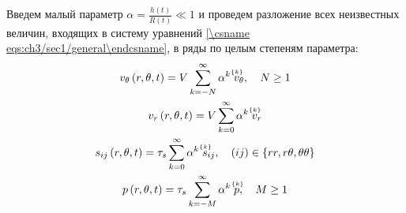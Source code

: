 Введем малый параметр $\alpha = \frac{h(t)}{R(t)} \ll 1$ и проведем разложение всех неизвестных величин, входящих в систему уравнений \cref{\csname eqs:ch3/sec1/general\endcsname}, в ряды по целым степеням параметра:
\begin{gather}
  \label{eqs:ch3/series/vt}
  v_{\theta}\left(r, \theta, t\right) = V \sum_{k=-N}^{\infty}{\alpha^{k} \; \uindex{v}{k}_{\theta}}, \quad N \ge 1
  \\
  \label{eqs:ch3/series/vr}
  v_{r}\left(r, \theta, t\right) = V \sum_{k=0}^{\infty}{\alpha^{k} \; \uindex{v}{k}_{r}}
  \\
  \label{eqs:ch3/series/sij}
  s_{ij}\left(r, \theta, t\right) = \tau_{s} \sum_{k=0}^{\infty}{\alpha^{k} \; \uindex{s}{k}_{ij}}, \quad (ij)\in\{rr, r\theta, \theta\theta\}
  \\
  \label{eqs:ch3/series/p}
  p\left(r, \theta, t \right) = \tau_{s} \sum_{k=-M}^{\infty}{\alpha^{k} \; \uindex{p}{k}}, \quad M \ge 1
\end{gather}

